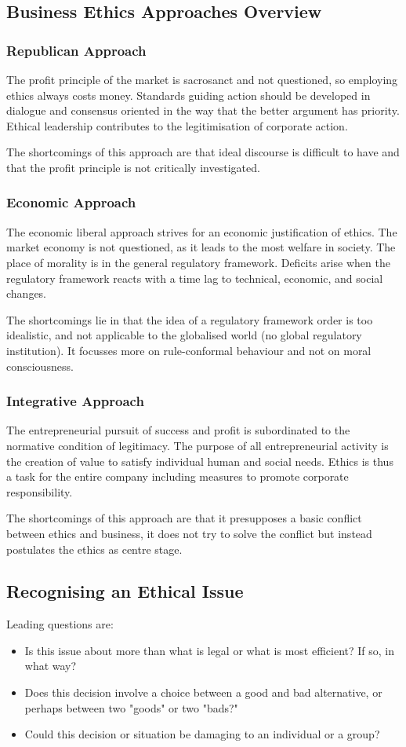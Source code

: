 \documentclass[11pt]{article}
\theoremstyle{definition}
\begin{document}
\subsection{Business Ethics Approaches Overview}
\subsubsection{Republican Approach}
The profit principle of the market is sacrosanct and not questioned, so employing ethics always costs money. Standards guiding action should be developed in dialogue and consensus oriented in the way that the better argument has priority. Ethical leadership contributes to the legitimisation of corporate action.

The shortcomings of this approach are that ideal discourse is difficult to have and that the profit principle is not critically investigated.

\subsubsection{Economic Approach}
The economic liberal approach strives for an economic justification of ethics. The market economy is not questioned, as it leads to the most welfare in society. The place of morality is in the general regulatory framework. Deficits arise when the regulatory framework reacts with a time lag to technical, economic, and social changes.

The shortcomings lie in that the idea of a regulatory framework order is too idealistic, and not applicable to the globalised world (no global regulatory institution). It focusses more on rule-conformal behaviour and not on moral consciousness.

\subsubsection{Integrative Approach}
The entrepreneurial pursuit of success and profit is subordinated to the normative condition of legitimacy. The purpose of all entrepreneurial activity is the creation of value to satisfy individual human and social needs. Ethics is thus a task for the entire company including measures to promote corporate responsibility.

The shortcomings of this approach are that it presupposes a basic conflict between ethics and business, it does not try to solve the conflict but instead postulates the ethics as centre stage.

\subsection{Recognising an Ethical Issue}
Leading questions are:
\begin{itemize}
	\item Is this issue about more than what is legal or what is most efficient? If so, in what way?
	\item Does this decision involve a choice between a good and bad alternative, or perhaps between two "goods" or two "bads?"
	\item Could this decision or situation be damaging to an individual or a group?
\end{itemize}
\end{document}
